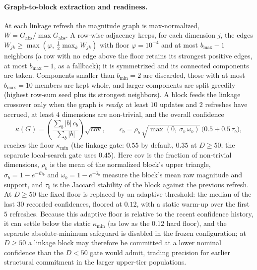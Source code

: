 \documentclass[algorithms,article,submit,moreauthors,pdftex]{Definitions/mdpi}
\begin{document}

\paragraph{Graph-to-block extraction and readiness.}
At each linkage refresh the magnitude graph is max-normalized,
$W = G_{\mathrm{abs}}/\max G_{\mathrm{abs}}$.  A row-wise adjacency keeps, for
each dimension $j$, the edges $W_{jk}\ge \max\!\left(\varphi,\ \tfrac12\max_k
W_{jk}\right)$ with floor $\varphi=10^{-4}$ and at most $b_{\max}-1$ neighbors
(a row with no edge above the floor retains its strongest positive edges, at
most $b_{\max}-1$, as a fallback);
it is symmetrized and its connected components are taken.  Components smaller
than $b_{\min}=2$ are discarded, those with at most $b_{\max}=10$ members are
kept whole, and larger components are split greedily (highest row-sum seed plus
its strongest neighbors).  A block feeds the linkage crossover only when the
graph is \emph{ready}: at least $10$ updates and $2$ refreshes have accrued, at
least $4$ dimensions are non-trivial, and the overall confidence
\begin{equation}\label{eq:opspec-conf}
\kappa(G) = \left(\frac{\sum_b \lvert b\rvert\,c_b}{\sum_b \lvert b\rvert}\right)
\sqrt{\mathrm{cov}},
\qquad
c_b = \rho_b\,\sqrt{\max\!\left(0,\ \sigma_b\,\omega_b\right)}\,
\bigl(0.5 + 0.5\,\tau_b\bigr),
\end{equation}
reaches the floor $\kappa_{\min}$ (the linkage gate: $0.55$ by default,
$0.35$ at $D\ge 50$; the separate local-search gate uses $0.45$).
Here $\mathrm{cov}$ is the fraction of non-trivial dimensions, $\rho_b$ is the
mean of the normalized block's upper triangle, $\sigma_b=1-e^{-\bar m_b}$ and
$\omega_b=1-e^{-\bar s_b}$ measure the block's mean raw magnitude and support,
and $\tau_b$ is the Jaccard stability of the block against the previous refresh.
At $D\ge 50$ the fixed floor is replaced by an adaptive threshold: the median of
the last $30$ recorded confidences, floored at $0.12$, with a static warm-up
over the first $5$ refreshes.  Because this adaptive floor is relative to the
recent confidence history, it can settle below the static $\kappa_{\min}$ (as
low as the $0.12$ hard floor), and the separate absolute-minimum safeguard is
disabled in the frozen configuration; at $D\ge 50$ a linkage block may therefore
be committed at a lower nominal confidence than the $D<50$ gate would admit,
trading precision for earlier structural commitment in the larger upper-tier
populations.
\end{document}
